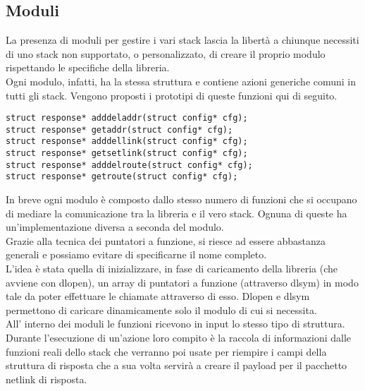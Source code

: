 \subsection{Moduli}
La presenza di moduli per gestire i vari stack lascia la libert\`a a chiunque necessiti di uno stack non supportato, o personalizzato, di creare il proprio modulo rispettando le specifiche della libreria.\\
Ogni modulo, infatti, ha la stessa struttura e contiene azioni generiche comuni in tutti gli stack. Vengono proposti i prototipi di queste funzioni qui di seguito.
\begin{lstlisting}[style=CStyle]
struct response* adddeladdr(struct config* cfg);
struct response* getaddr(struct config* cfg);
struct response* adddellink(struct config* cfg);
struct response* getsetlink(struct config* cfg);
struct response* adddelroute(struct config* cfg);
struct response* getroute(struct config* cfg);
\end{lstlisting}
In breve ogni modulo \`e composto dallo stesso numero di funzioni che si occupano di mediare la comunicazione tra la libreria e il vero stack.
Ognuna di queste ha un'implementazione diversa a seconda del modulo.\\
Grazie alla tecnica dei puntatori a funzione, si riesce ad essere abbastanza generali e possiamo evitare di specificarne il nome completo.\\
L'idea \`e stata quella di inizializzare, in fase di caricamento della libreria (che avviene con dlopen), un array di puntatori a funzione (attraverso dlsym) in modo tale da poter effettuare le chiamate attraverso di esso. Dlopen e dlsym permettono di caricare dinamicamente solo il modulo di cui si necessita.\\
All' interno dei moduli le funzioni ricevono in input lo stesso tipo di struttura. Durante l'esecuzione di un'azione loro compito \`e la raccola di informazioni dalle funzioni reali dello stack che verranno poi usate per riempire i campi della struttura di risposta che a sua volta servir\`a a creare il payload per il pacchetto netlink di risposta.
\clearpage{\pagestyle{empty}\cleardoublepage}
